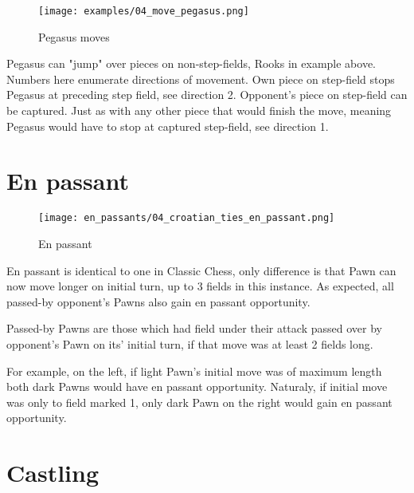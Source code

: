 \noindent
\begin{figure}[!h]
\vspace{-1.2\baselineskip}
\texttt{[image: examples/04\_move\_pegasus.png]}
\caption{Pegasus moves}
\label{fig:04_move_pegasus}
\end{figure}

Pegasus can "jump" over pieces on non-step-fields, Rooks in example above. Numbers
here enumerate directions of movement. Own piece on step-field stops Pegasus at
preceding step field, see direction 2. Opponent's piece on step-field can be captured.
Just as with any other piece that would finish the move, meaning Pegasus would have to
stop at captured step-field, see direction 1.

\clearpage %

\section*{En passant}

\noindent
\begin{wrapfigure}{l}{0.4\textwidth}
\centering
\texttt{[image: en\_passants/04\_croatian\_ties\_en\_passant.png]}
\caption{En passant}
\label{fig:04_croatian_ties_en_passant}
\end{wrapfigure}
En passant is identical to one in Classic Chess, only difference is that Pawn can now
move longer on initial turn, up to 3 fields in this instance. As expected, all passed-by
opponent's Pawns also gain en passant opportunity.

Passed-by Pawns are those which had field under their attack passed over by opponent's Pawn
on its' initial turn, if that move was at least 2 fields long.

For example, on the left, if light Pawn's initial move was of maximum length both dark Pawns
would have en passant opportunity. Naturaly, if initial move was only to field marked 1, only
dark Pawn on the right would gain en passant opportunity.

\clearpage %

\section*{Castling}

